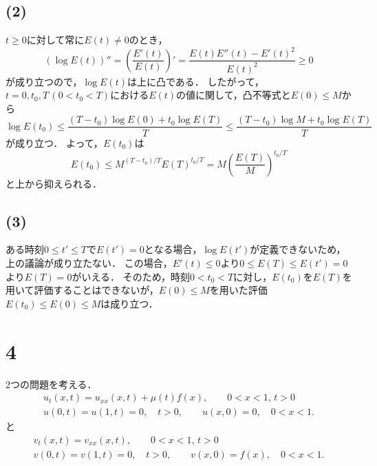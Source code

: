 \documentclass[a4paper,11pt]{jsarticle}
\begin{document}
\subsection*{(2)}
$t\ge 0$に対して常に$E(t)\neq 0$のとき，
\begin{equation}
  (\log{E(t)})'' = \left(\frac{E'(t)}{E(t)}\right)' = \frac{E(t)E''(t) - E'(t)^2}{E(t)^2} \ge 0
\end{equation}
が成り立つので，$\log{E(t)}$は上に凸である．
したがって，$t=0,t_0,T\,(0<t_0<T)$における$E(t)$の値に関して，凸不等式と$E(0)\le M$から
\begin{equation}
  \log{E(t_0)} \le \frac{(T-t_0)\log{E(0)} + t_0\log{E(T)}}{T} \le \frac{(T-t_0)\log{M} + t_0\log{E(T)}}{T}
\end{equation}
が成り立つ．
よって，$E(t_0)$は
\begin{equation}
  E(t_0) \le M^{(T-t_0)/T} E(T)^{t_0/T} = M \left(\frac{E(T)}{M}\right)^{t_0/T}
\end{equation}
と上から抑えられる．

\subsection*{(3)}
ある時刻$0\le t' \le T$で$E(t')=0$となる場合，$\log{E(t')}$が定義できないため，上の議論が成り立たない．
この場合，$E'(t)\le 0$より$0\le E(T)\le E(t')=0$より$E(T)=0$がいえる．
そのため，時刻$0<t_0<T$に対し，$E(t_0)$を$E(T)$を用いて評価することはできないが，$E(0)\le M$を用いた評価$E(t_0)\le E(0) \le M$は成り立つ．

\section*{4}
2つの問題を考える．
\begin{align}
  u_t(x,t) = u_{xx}(x,t) + \mu(t)f(x),\qquad 0<x<1,\,t>0 \\
  u(0,t)=u(1,t)=0,\quad t>0,\qquad u(x,0)=0,\quad 0<x<1.
\end{align}
と
\begin{align}
  v_t(x,t) = v_{xx}(x,t),\qquad 0<x<1,\,t>0 \\
  v(0,t)=v(1,t)=0,\quad t>0,\qquad v(x,0)=f(x),\quad 0<x<1.  
\end{align}
\end{document}
